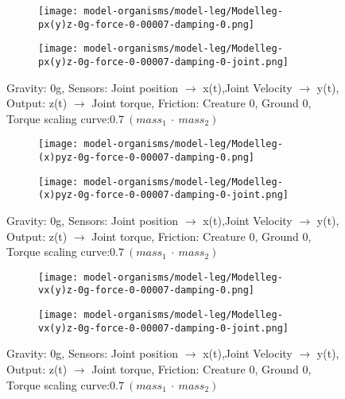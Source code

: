 \documentclass[main]{subfiles}
\begin{document}
\begin{figure}[H]
	\centering
		\begin{subfigure}[c]{0.45\textwidth}
	\texttt{[image: model-organisms/model-leg/Modelleg-px(y)z-0g-force-0-00007-damping-0.png]}
		\end{subfigure}
	\begin{subfigure}[c]{0.45\textwidth}
	\texttt{[image: model-organisms/model-leg/Modelleg-px(y)z-0g-force-0-00007-damping-0-joint.png]}
		\end{subfigure}
	\caption[Figure of chaotic behaviors in range 2.4-3.19]{Gravity: 0g, Sensors:  Joint position \(\rightarrow\) x(t),Joint Velocity \(\rightarrow\) y(t), Output: z(t) \(\rightarrow\) Joint torque, Friction: Creature 0, Ground 0, Torque scaling curve:\(0.7~(mass_1~\cdot~mass_2)\)}

	\label{figure:z-2.4-3.19-chaotictrajectories}
\end{figure}

\begin{figure}[H]
	\centering
		\begin{subfigure}[c]{0.45\textwidth}
	\texttt{[image: model-organisms/model-leg/Modelleg-(x)pyz-0g-force-0-00007-damping-0.png]}
		\end{subfigure}
	\begin{subfigure}[c]{0.45\textwidth}
	\texttt{[image: model-organisms/model-leg/Modelleg-(x)pyz-0g-force-0-00007-damping-0-joint.png]}
		\end{subfigure}
	\caption[Figure of chaotic behaviors in range 2.4-3.19]{Gravity: 0g, Sensors:  Joint position \(\rightarrow\) x(t),Joint Velocity \(\rightarrow\) y(t), Output: z(t) \(\rightarrow\) Joint torque, Friction: Creature 0, Ground 0, Torque scaling curve:\(0.7~(mass_1~\cdot~mass_2)\)}

	\label{figure:z-2.4-3.19-chaotictrajectories}
\end{figure}

\begin{figure}[H]
	\centering
		\begin{subfigure}[c]{0.45\textwidth}
	\texttt{[image: model-organisms/model-leg/Modelleg-vx(y)z-0g-force-0-00007-damping-0.png]}
		\end{subfigure}
	\begin{subfigure}[c]{0.45\textwidth}
	\texttt{[image: model-organisms/model-leg/Modelleg-vx(y)z-0g-force-0-00007-damping-0-joint.png]}
		\end{subfigure}
	\caption[Figure of chaotic behaviors in range 2.4-3.19]{Gravity: 0g, Sensors:  Joint position \(\rightarrow\) x(t),Joint Velocity \(\rightarrow\) y(t), Output: z(t) \(\rightarrow\) Joint torque, Friction: Creature 0, Ground 0, Torque scaling curve:\(0.7~(mass_1~\cdot~mass_2)\)}

	\label{figure:z-2.4-3.19-chaotictrajectories}
\end{figure}
\end{document}
